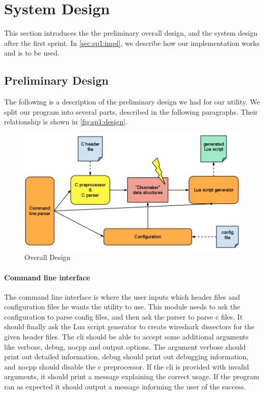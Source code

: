 \section{System Design}
\label{sec:sp1:design}
This section introduces the the preliminary overall design, and the  
system design after the first sprint. In \autoref{sec:sp1:impl}, we describe 
how our implementation works and is to be used.

\subsection{Preliminary Design}
The following is a description of the preliminary design we had for our
\gls{utility}. We split our program into several parts, described in the
following paragraphs. Their relationship is shown in
\autoref{fig:sp1:design}.

\begin{figure}[!htb]
	\center
	\includegraphics[width=\textwidth]{./sprints/img/design}
	\caption{Overall Design\label{fig:sp1:design}}
\end{figure}

\paragraph{Command line interface}
The command line interface is where the user inputs which \gls{header} files and
configuration files he wants the \gls{utility} to use. This module needs to ask
the configuration to parse config files, and then ask the parser to parse \Gls{c}
files. It should finally ask the Lua script generator to create \Gls{wireshark} \glspl{dissector}
for the given \gls{header} files. The \gls{cli} should be able to accept some additional
arguments like verbose, debug, nocpp and output options.
The argument verbose should print out detailed information,
debug should print out debugging information, and nocpp should
disable the \Gls{c} \gls{preprocessor}. If the \gls{cli} is provided with invalid arguments, 
it should print a message explaining the correct usage.
If the program ran as expected it should output a message informing
the user of the success. 

